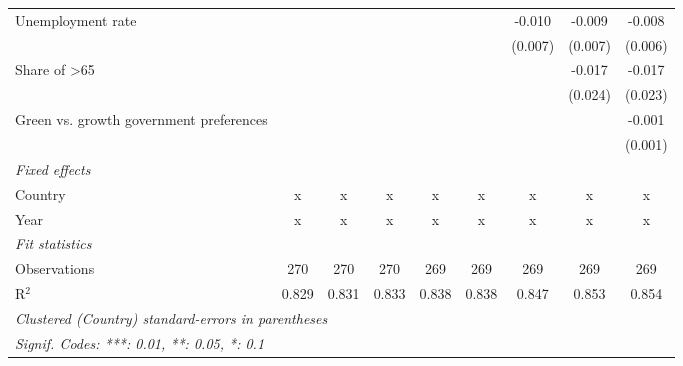 \begin{table}[htbp]
\begin{tabular}{lcccccccc}
      Unemployment rate                                       &         &         &         &         &         & -0.010  & -0.009  & -0.008\\   
                                                              &         &         &         &         &         & (0.007) & (0.007) & (0.006)\\   
      Share of >65                                            &         &         &         &         &         &         & -0.017  & -0.017\\   
                                                              &         &         &         &         &         &         & (0.024) & (0.023)\\   
      Green vs. growth government preferences                 &         &         &         &         &         &         &         & -0.001\\   
                                                              &         &         &         &         &         &         &         & (0.001)\\   
      \emph{Fixed effects}\\
      Country                                                 & x       & x       & x       & x       & x       & x       & x       & x\\  
      Year                                                    & x       & x       & x       & x       & x       & x       & x       & x\\  
      \midrule \emph{Fit statistics}\\
      Observations                                            & 270     & 270     & 270     & 269     & 269     & 269     & 269     & 269\\  
      R$^2$                                                   & 0.829   & 0.831   & 0.833   & 0.838   & 0.838   & 0.847   & 0.853   & 0.854\\  
      \midrule
      \multicolumn{9}{l}{\emph{Clustered (Country) standard-errors in parentheses}}\\
      \multicolumn{9}{l}{\emph{Signif. Codes: ***: 0.01, **: 0.05, *: 0.1}}\\
   \end{tabular}
\end{table}


